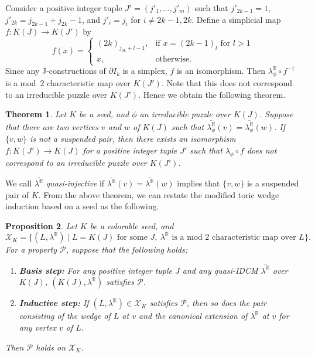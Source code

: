\documentclass[11pt]{amsart}
\theoremstyle{plain}
\newtheorem{theorem}{Theorem}[section]
\newtheorem{proposition}[theorem]{Proposition}
\numberwithin{equation}{section}
\theoremstyle{definition}
\newcommand{\R}{\mathbb{R}}
\newcommand{\cP}{\mathcal{P}}
\newcommand{\cX}{\mathcal{X}}
\begin{document}
Consider a positive integer tuple $J' = (j'_1, \dots, j'_m)$ such that $j'_{2k-1} = 1$, $j'_{2k}  = j_{2k-1}+j_{2k}-1$, and $j'_i = j_i$ for $i \not=2k-1, 2k$.
Define a simplicial map $f \colon K(J) \to K(J')$ by \begin{equation}
                                                       f(x) = \begin{cases}
                                                             (2k)_{j_{2k}+l-1}, & \mbox{if } x = (2k-1)_l \mbox{ for } l>1 \\
                                                             x, & \mbox{otherwise}.
                                                           \end{cases}
                                                     \end{equation}
Since any J-constructions of $\partial I_k$ is a simplex, $f$ is an isomorphism.
Then $\lambda^\R_\phi \circ f^{-1}$ is a mod~$2$ characteristic map over $K(J')$.
Note that this does not correspond to an irreducible puzzle over $K(J')$.
Hence we obtain the following theorem.

\begin{theorem}
  Let $K$ be a seed, and $\phi$ an irreducible puzzle over $K(J)$.
  Suppose that there are two vertices $v$ and $w$ of $K(J)$ such that $\overline{\lambda_\phi^\R}(v) = \overline{\lambda_\phi^\R}(w)$.
  If $\{v, w\}$ is not a suspended pair, then there exists an isomorphism $f \colon K(J') \to K(J)$ for a positive integer tuple $J'$ such that $\lambda_\phi \circ f$ does not correspond to an irreducible puzzle over $K(J')$.
\end{theorem}

We call $\overline{\lambda^\R}$ \emph{quasi-injective} if $\overline{\lambda^\R}(v) =\overline{\lambda^\R}(w)$ implies that $\{v, w\}$ is a suspended pair of $K$. 
From the above theorem, we can restate the modified toric wedge induction based on a seed as the following.

\begin{proposition} \label{MTWI2}
    Let $K$ be a colorable seed, and
    $$
        \cX_K=\{(L, \lambda^\R) \mid L=K(J) \text{ for some } J, \ \lambda^\R \text{ is a mod~$2$ characteristic map over } L \}.
    $$
    For a property $\cP$, suppose that the following holds;
    \begin{enumerate}
      \item \textbf{Basis step:} For any positive integer tuple $J$ and any quasi-IDCM $\overline{\lambda^\R}$ over $K(J)$, $(K(J),\lambda^\R)$ satisfies $\cP$.
      \item \textbf{Inductive step:} If $(L, \lambda^\R) \in \cX_K$ satisfies $\cP$, then so does the pair consisting of the wedge of $L$ at $v$ and the canonical extension of $\lambda^\R$ at $v$ for any vertex $v$ of $L$.
    \end{enumerate}
    Then $\cP$ holds on $\cX_K$.
\end{proposition}
\end{document}
